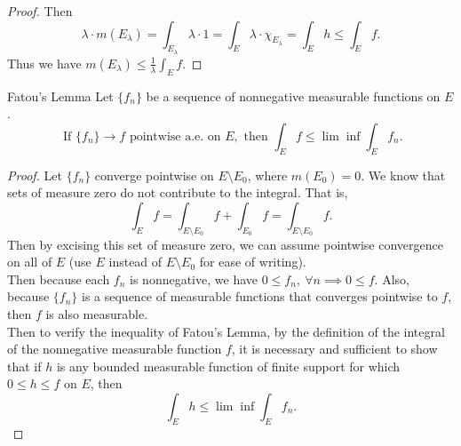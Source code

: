 \begin{flushleft}
\begin{proof}
        Then 
        \[
            \lambda\cdot m(E_\lambda)=\int_{E_{\lambda}}\lambda\cdot1=\int_E\lambda\cdot\chi_{E_{\lambda}}=\int_Eh\le\int_Ef.
        \]
        Thus we have $m(E_\lambda)\le\frac{1}{\lambda}\int_Ef$.
    \end{proof}
    \begin{namedthm*}{Fatou's Lemma}
        Let $\{f_n\}$ be a sequence of nonnegative measurable functions on $E$.
        \[
            \text{ If }\{f_n\}\to f\text{ pointwise a.e. on }E,\text{ then }\int_Ef\le\lim\inf\int_Ef_n.    
        \]
    \end{namedthm*}
    \begin{proof}
        Let $\{f_n\}$ converge pointwise on $E\setminus E_0$, where $m(E_0)=0$. 
        We know that sets of measure zero do not contribute to the integral. 
        That is,
        \[
            \int_Ef=\int_{E\setminus E_0}f+\int_{E_0}f=\int_{E\setminus E_0}f.
        \]
        Then by excising this set of measure zero, we can assume pointwise convergence on all of $E$ (use $E$ instead of $E\setminus E_0$ for ease of writing).
        \\Then because each $f_n$ is nonnegative, we have $0\le f_n,\ \forall n\implies 0\le f$.
        Also, because $\{f_n\}$ is a sequence of measurable functions that converges pointwise to $f$, then $f$ is also measurable.
        \\Then to verify the inequality of Fatou's Lemma, by the definition of the integral of the nonnegative measurable function $f$, it is necessary and sufficient to show that if $h$ is any bounded measurable function of finite support for which $0\le h\le f$ on $E$, then
        \[
            \int_Eh\le\lim\inf\int_Ef_n.
        \]

\end{proof}
\end{flushleft}
